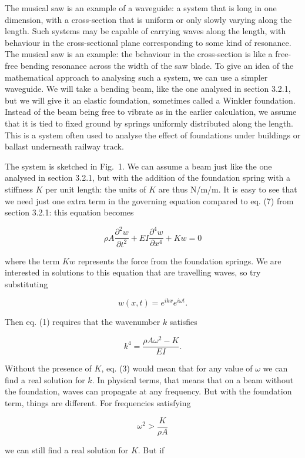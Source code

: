   The musical saw is an example of a waveguide: a system that is long in one 
  dimension, with a cross-section that is uniform or only slowly varying along 
  the length. Such systems may be capable of carrying waves along the length, 
  with behaviour in the cross-sectional plane corresponding to some kind of 
  resonance. The musical saw is an example: the behaviour in the cross-section 
  is like a free-free bending resonance across the width of the saw blade. To 
  give an idea of the mathematical approach to analysing such a system, we can 
  use a simpler waveguide. We will take a bending beam, like the one analysed 
  in section 3.2.1, but we will give it an elastic foundation, sometimes called 
  a Winkler foundation. Instead of the beam being free to vibrate as in the 
  earlier calculation, we assume that it is tied to fixed ground by springs 
  uniformly distributed along the length. This is a system often used to 
  analyse the effect of foundations under buildings or ballast underneath 
  railway track. 

  The system is sketched in Fig.\ 1. We can assume a beam just like the one 
  analysed in section 3.2.1, but with the addition of the foundation spring 
  with a stiffness $K$ per unit length: the units of $K$ are thus N/m/m. It is 
  easy to see that we need just one extra term in the governing equation 
  compared to eq. (7) from section 3.2.1: this equation becomes 

  $$\rho A \dfrac{\partial^2 w}{\partial t^2}+EI \dfrac{\partial^4 w}{\partial 
  x^4} + K w=0\tag{1}$$ 

  where the term $Kw$ represents the force from the foundation springs. We are 
  interested in solutions to this equation that are travelling waves, so try 
  substituting 

  $$w(x,t) = e^{i k x} e^{i \omega t} .\tag{2}$$ 

  Then eq. (1) requires that the wavenumber $k$ satisfies 

  $$k^4 = \dfrac{\rho A \omega^2 -K}{EI} . \tag{3}$$ 

  Without the presence of $K$, eq. (3) would mean that for any value of 
  $\omega$ we can find a real solution for $k$. In physical terms, that means 
  that on a beam without the foundation, waves can propagate at any frequency. 
  But with the foundation term, things are different. For frequencies 
  satisfying 

  $$\omega^2 > \frac{K}{\rho A} \tag{4}$$ 

  we can still find a real solution for $K$. But if 

